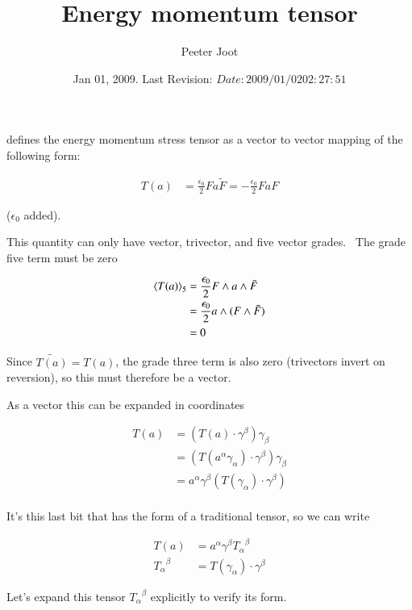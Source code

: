 \documentclass{article}
\title{ Energy momentum tensor }
\author{Peeter Joot}
\date{ Jan 01, 2009.  Last Revision: $Date: 2009/01/02 02:27:51 $ }
\begin{document}
\maketitle{}


\cite{doran2003gap} defines the energy momentum stress tensor as a vector to
vector mapping of the following form:

\begin{align*}
T(a) 
&= \frac{\epsilon_0}{2} F a \tilde{F}
= - \frac{\epsilon_0}{2} F a F
\end{align*}

($\epsilon_0$ added).

This quantity can only have vector, trivector, and five vector grades.  The 
grade five term must be zero

\begin{align*}
{\left\langle{{T(a)}}\right\rangle}_{5}
&= \frac{\epsilon_0}{2} F \wedge a \wedge \tilde{F} \\
&= \frac{\epsilon_0}{2} a \wedge (F \wedge \tilde{F}) \\
&= 0
\end{align*}

Since $\tilde{T(a)} = T(a)$, the grade three term is also zero (trivectors invert on reversion), so this must therefore be a vector.

As a vector this can be expanded in coordinates

\begin{align*}
T(a) 
&= \left(T(a) \cdot \gamma^\beta \right) \gamma_\beta \\
&= \left(T(a^\alpha \gamma_\alpha) \cdot \gamma^\beta \right) \gamma_\beta \\
&= a^\alpha \gamma^\beta \left(T(\gamma_\alpha) \cdot \gamma^\beta \right) \\
\end{align*}

It's this last bit that has the form of a traditional tensor, so we can write

\begin{align*}
T(a) &= a^\alpha \gamma^\beta {T_\alpha}^{\beta} \\
{T_\alpha}^{\beta} &= T(\gamma_\alpha) \cdot \gamma^\beta 
\end{align*}

Let's expand this tensor ${T_\alpha}^{\beta}$ explicitly to verify its form.
\end{document}
